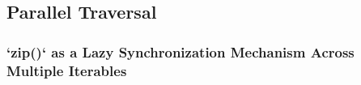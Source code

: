\subsection{Parallel Traversal}
\subsubsection{`zip()` as a Lazy Synchronization Mechanism Across Multiple Iterables}
